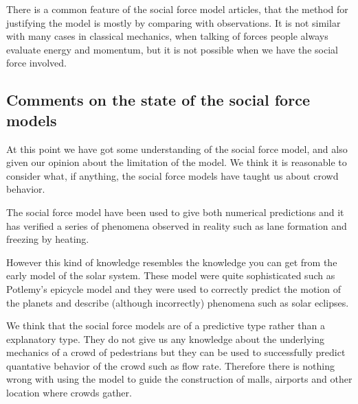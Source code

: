 There is a common feature of the social force model articles, that the method for 
justifying the model is mostly by comparing with observations. It is not 
similar with many cases in classical mechanics, when talking of forces people 
always evaluate energy and momentum, but it is not possible when we have 
the social force involved.

\subsection{Comments on the state of the social force models}
At this point we have got some understanding of the social force model, and 
also given our opinion about the limitation of the model. We think it is 
reasonable to consider what, if anything, the social force models have taught 
us about crowd behavior. 

The social force model have been used to give both numerical predictions 
and it has verified a series of phenomena observed in reality such as 
lane formation and freezing by heating.

However this kind of knowledge resembles the knowledge you can get from 
the early model of the solar system. These model were quite sophisticated 
such as Potlemy's epicycle model and they were used to correctly predict the 
motion of the planets and describe (although incorrectly) phenomena such as 
solar eclipses.

We think that the social force models are of a predictive type rather than 
a explanatory type. They do not give us any knowledge about the underlying 
mechanics of a crowd of pedestrians but they can be used to successfully 
predict quantative behavior of the crowd such as  flow rate. Therefore there 
is nothing wrong with using the model to guide the construction of malls, airports 
and other location where crowds gather.